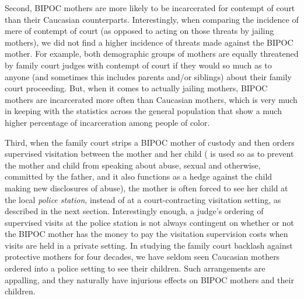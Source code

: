 Second, BIPOC mothers are more likely to be incarcerated for contempt of court than their Caucasian counterparts. Interestingly, when comparing the incidence of mere
 of contempt of court (as opposed to acting on those threats
by jailing mothers), we did not find a higher incidence of threats made
against the BIPOC mother. For example, both demographic groups of
mothers are equally threatened by family court judges with contempt of
court if they would so much as  to anyone (and sometimes this
includes parents and/or siblings) about their family court proceeding.
But, when it comes to actually jailing mothers, BIPOC mothers are incarcerated more often than Caucasian mothers, which is very much in
keeping with the statistics across the general population that show a much
higher percentage of incarceration among people of color. \pfl{}

Third, when the family court strips a BIPOC mother of custody and then
orders supervised visitation between the mother and her child ( is used so as to prevent the mother and child from speaking
about abuse, sexual and otherwise, committed by the father, and it also
functions as a hedge against the child making new 
disclosures of abuse), the mother is often forced to see her
child at the local \textit{police station}, instead of at a court-contracting visitation setting, as described in the next section. Interestingly enough, a
judge's ordering of supervised visits at the police station is not always
contingent on whether or not the BIPOC mother has the 
money to pay the visitation supervision costs when visits are 
held in a private setting. In
studying the family court backlash against protective mothers for 
four decades, we have seldom seen Caucasian mothers ordered into
a police setting to see their children. Such arrangements are appalling,
and they naturally have injurious effects on BIPOC mothers and their
children. \pfl{}

